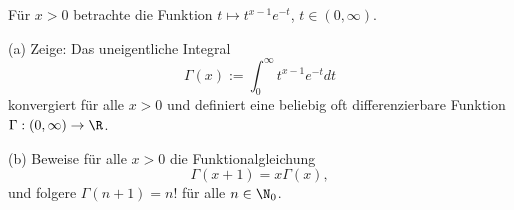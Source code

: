 \begin{prob}
F\"ur $x>0$ betrachte die Funktion $t\mapsto t^{x-1}e^{-t}$, $t\in(0,\infty)$.

(a) Zeige: Das uneigentliche Integral
$$
   \Gamma(x):=\int_0^\infty t^{x-1}e^{-t}dt
$$
konvergiert f\"ur alle $x>0$ und definiert eine beliebig oft
differenzierbare Funktion $\Gamma:(0,\infty)\to\R$. 

(b) Beweise f\"ur alle $x>0$ die Funktionalgleichung
$$
   \Gamma(x+1) = x\Gamma(x),
$$
und folgere $\Gamma(n+1)=n!$ f\"ur alle $n\in\N_0$. 
\end{prob}
